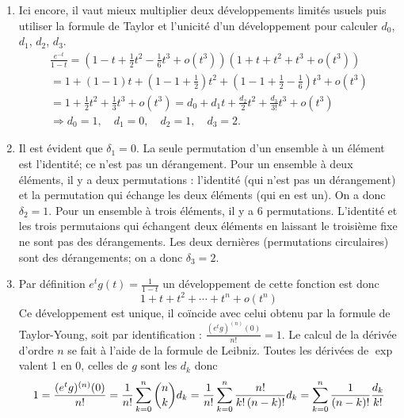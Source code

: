 \begin{enumerate}
\item  Ici encore, il vaut mieux multiplier deux d{\'e}veloppements limit{\'e}s usuels puis utiliser la formule de Taylor et l'unicit{\'e} d'un d{\'e}veloppement pour calculer $d_{0}$, $d_{1}$, $d_{2}$, $d_{3}$.
\begin{multline*}
\frac{e^{-t}}{1-t} 
 = (1-t + \frac{1}{2}t^{2} - \frac{1}{6}t^{3} + o(t^{3}))(1+t+t^{2}+t^{3}+o(t^{3})) \\
 = 1 + (1-1)t + (1-1 + \frac{1}{2})t^{2} + (1-1+\frac{1}{2} -\frac{1}{6})t^{3}+o(t^{3}) \\
 = 1 + \frac{1}{2}t^{2} + \frac{1}{3}t^{3} + o(t^{3}) 
 = d_{0} + d_{1}t + \frac{d_{2}}{2}t^{2} + \frac{d_{3}}{3!}t^{3}+o(t^{3})\\
\Rightarrow d_{0} = 1,\quad d_{1} = 0,\quad d_{2} = 1,\quad d_{3} = 2.
 \end{multline*}

\item  Il est {\'e}vident que $\delta _{1}=0$. La seule permutation d'un ensemble {\`a} un {\'e}l{\'e}ment est l'identit{\'e}; ce n'est pas un
d{\'e}rangement.\newline
Pour un ensemble {\`a} deux {\'e}l{\'e}ments, il y a deux permutations : l'identit{\'e} (qui n'est pas un d{\'e}rangement) et la permutation qui
{\'e}change les deux {\'e}l{\'e}ments (qui en est un). On a donc $\delta_{2}=1$.\newline
Pour un ensemble {\`a} trois {\'e}l{\'e}ments, il y a 6 permutations. L'identit{\'e} et les trois permutaions qui {\'e}changent deux
{\'e}l{\'e}ments en laissant le troisi{\`e}me fixe ne sont pas des d{\'e}rangements. Les deux derni{\`e}res (permutations circulaires) sont des
d{\'e}rangements; on a donc $\delta _{3}=2$.

\item  Par d{\'e}finition $e^{t}g(t)=\frac{1}{1-t}$ un d{\'e}veloppement de cette fonction est donc
\[
1+t+t^{2}+\cdots +t^{n}+o(t^{n})
\]
Ce d{\'e}veloppement est unique, il co\"{i}ncide avec celui obtenu par la
formule de Taylor-Young, soit par identification : $\frac{(e^{t}g)^{(n)}(0)}{n!}=1$. Le calcul de la d{\'e}riv{\'e}e d'ordre $n$ se fait {\`a} l'aide de
la formule de Leibniz. Toutes les d{\'e}riv{\'e}es de $\exp $ valent 1 en 0, celles de $g$ sont les $d_{k}$ donc
\[
1=\frac{(e^{t}g)^{(n)}(0)}{n!}=\frac{1}{n!}\sum_{k=0}^{n}\binom{n}{k}d_{k}=%
\frac{1}{n!}\sum_{k=0}^{n}\frac{n!}{k!\,(n-k)!}d_{k}=\sum_{k=0}^{n}\frac{1}{%
(n-k)!}\frac{d_{k}}{k!}
\]


\end{enumerate}
